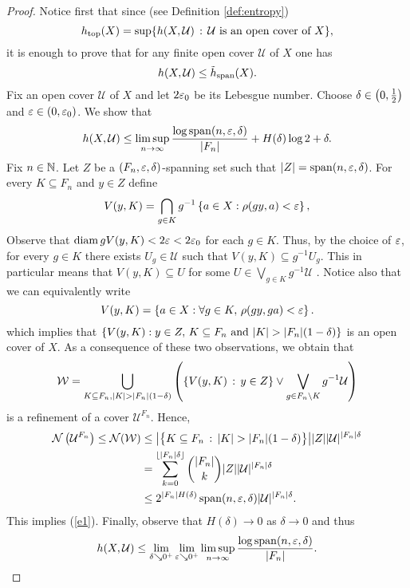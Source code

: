 \begin{proof}
Notice first that since (see Definition \ref{def:entropy})
\[
h_\mathrm{top}(X)=\sup\{h(X,\mathcal U)\,:\,\mathcal U\text{ is an open cover of }X\},
\]
it is enough to prove that for  any finite open cover $\mathcal U$ of $X$ one has 
\[
h(X, \mathcal U)\leq \tilde{h}_{\mathrm{span}}(X).
\]
Fix an open cover $\mathcal U$ of $X$ and let $2\varepsilon_0$ be its Lebesgue number.
Choose $\delta\in\left(0,\frac{1}{2}\right)$ and $\varepsilon\in(0,\varepsilon_0)$.
We show that 
\begin{equation}\label{e1}
h(X,\mathcal U)\leq \limsup\limits_{n\to\infty}\frac{\log \operatorname{span}(n,\varepsilon,\delta)}{|F_n|}+ H(\delta)\log 2+\delta.
\end{equation}
Fix $n\in\mathbb{N}$. Let $Z$ be a $(F_n,\varepsilon, \delta)$-spanning set such that $|Z|=\operatorname{span}(n,\varepsilon,\delta)$.
For every $K\subseteq F_n$ and $y\in Z$ define 
\[
V(y,K)=\bigcap_{g\in K}g^{-1}\left\{a\in X : \rho(gy,a)<\varepsilon\right\},
\]
Observe that $\operatorname{diam} gV(y,K) < 2\varepsilon<2\varepsilon_0$ for each $g\in K$. Thus, by the choice of $\varepsilon$, for every $g\in K$ there exists $U_g\in \mathcal U$ such that $V(y,K)\subseteq g^{-1}U_g$. This in particular means that $V(y,K)\subseteq U$ for some $U\in  \bigvee_{g\in K}g^{-1}\mathcal U$ .
Notice also that we can equivalently write 
\[
V(y,K) = \left\{a\in X : \forall g\in K,\, \rho(gy,ga)<\varepsilon\right\}.
\]
which implies that $\inbrace{V(y,K): y\in Z, \, K\subseteq F_n \text{ and } |K|>|F_n|(1-\delta)}$ is an open cover of $X$.
As a consequence of these two observations, we obtain that
\[
\mathcal W=\bigcup_{K\subseteq F_n,\\ |K|>|F_n|(1-\delta)}\left(\inbrace{V(y,K)\,:\,y\in Z}\vee\bigvee_{g\in F_n\setminus K}g^{-1}\mathcal U\right)
\]
is a refinement of a cover $\mathcal U^{F_n}$.
Hence,
\begin{align*}
\mathcal N\left(\mathcal U^{F_n}\right)\leq\mathcal N(\mathcal W)&\leq \big|\big\{K\subseteq F_n\,:\,|K|>|F_n|(1-\delta)\big\}\big| |Z| |\mathcal U|^{|F_n|\delta}\\
&=\sum_{k=0}^{\lfloor |F_n|\delta\rfloor}{| F_n| \choose k}|Z| |\mathcal U|^{|F_n|\delta}\\
&\leq 2^{|F_n|H(\delta)} \spn(n,\eps,\delta) |\mathcal U|^{|F_n|\delta}.
\end{align*}
This implies (\ref{e1}). Finally, observe that $H(\delta)\to 0$ as $\delta\to 0$ and thus
\[
h(X,\operatorname{\mathcal{U}})\leq \lim\limits_{\delta\searrow 0^+}\lim\limits_{\varepsilon\searrow 0^+}\limsup\limits_{n\to\infty}\frac{\log \operatorname{span}(n,\varepsilon, \delta)}{|F_n|}.\qedhere
\]
\end{proof}

